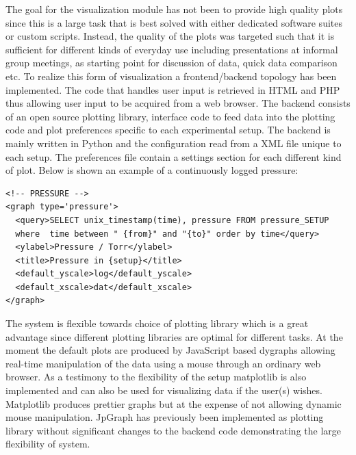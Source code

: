 The goal for the visualization module has not been to provide high quality
plots since this is a large task that is best solved with either dedicated
software suites or custom scripts. Instead, the quality of the plots was
targeted such that it is sufficient for different kinds of everyday use
including presentations at informal group meetings, as starting point for
discussion of data, quick data comparison etc. To realize this form of
visualization a frontend/backend topology has been implemented. The code that
handles user input is retrieved in HTML and PHP thus allowing user input to be
acquired from a web browser. The backend consists of an open source plotting
library, interface code to feed data into the plotting code and plot
preferences specific to each experimental setup. The backend is mainly written
in Python and the configuration read from a XML file unique to each setup. The
preferences file contain a settings section for each different kind of plot.
Below is shown an example of a continuously logged pressure:

\begin{verbatim} 
<!-- PRESSURE --> 
<graph type='pressure'>
  <query>SELECT unix_timestamp(time), pressure FROM pressure_SETUP
  where  time between " {from}" and "{to}" order by time</query>
  <ylabel>Pressure / Torr</ylabel>
  <title>Pressure in {setup}</title>
  <default_yscale>log</default_yscale>
  <default_xscale>dat</default_xscale>
</graph>
\end{verbatim}

The system is flexible towards choice of plotting library which is a great
advantage since different plotting libraries are optimal for different tasks.
At the moment the default plots are produced by JavaScript based
dygraphs\cite{dygraphs} allowing real-time manipulation of the data using a
mouse through an ordinary web browser. As a testimony to the flexibility of the
setup matplotlib\cite{matplotlib} is also implemented and can also be used for
visualizing data if the user(s) wishes. Matplotlib produces prettier graphs but at the expense of not allowing dynamic mouse manipulation. JpGraph\cite{jpgraph} has previously
been implemented as plotting library without significant changes to the backend
code demonstrating the large flexibility of system.
